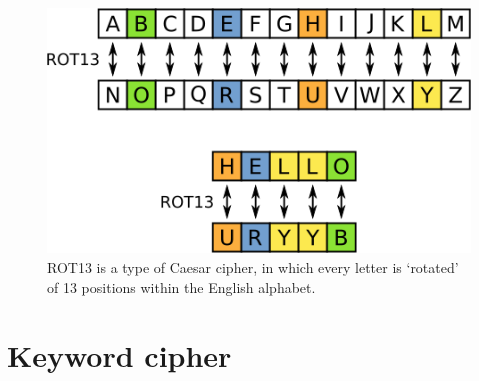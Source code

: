 \documentclass[Lau,binding=0.6cm,oneside]{sapthesis}
\begin{document}
\begin{figure}[h]
\includegraphics[scale=0.4]{rot13}
\captionsetup{justification=centering, margin=2cm}
\centering
\caption{\textsf{ROT13} is a type of Caesar cipher, in which every letter is `rotated' of 13 positions within the English alphabet.}
\centering
\end{figure}

\section{Keyword cipher}
\end{document}
